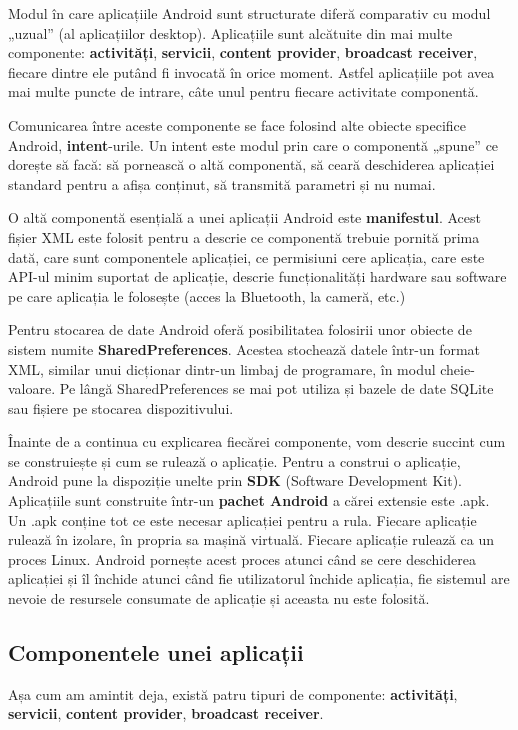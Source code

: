 \documentclass[12pt,a4paper]{article}
\begin{document}
Modul în care aplicațiile Android sunt structurate diferă comparativ cu modul „uzual” (al aplicațiilor desktop). Aplicațiile sunt alcătuite din mai multe componente: \textbf{activități}, \textbf{servicii}, \textbf{content provider}, \textbf{broadcast receiver}, fiecare dintre ele putând fi invocată în orice moment. Astfel aplicațiile pot avea mai multe puncte de intrare, câte unul pentru fiecare activitate componentă.

Comunicarea între aceste componente se face folosind alte obiecte specifice Android, \textbf{intent}-urile. Un intent este modul prin care o componentă „spune” ce dorește să facă: să pornească o altă componentă, să ceară deschiderea aplicației standard pentru a afișa conținut, să transmită parametri și nu numai.

O altă componentă esențială a unei aplicații Android este \textbf{manifestul}. Acest fișier XML este folosit pentru a descrie ce componentă trebuie pornită prima dată, care sunt componentele aplicației, ce permisiuni cere aplicația, care este API-ul minim suportat de aplicație, descrie funcționalități hardware sau software pe care aplicația le folosește (acces la Bluetooth, la cameră, etc.)

Pentru stocarea de date Android oferă posibilitatea folosirii unor obiecte de sistem numite \textbf{SharedPreferences}. Acestea stochează datele într-un format XML, similar unui dicționar dintr-un limbaj de programare, în modul cheie-valoare. Pe lângă SharedPreferences se mai pot utiliza și bazele de date SQLite sau fișiere pe stocarea dispozitivului.

Înainte de a continua cu explicarea fiecărei componente, vom descrie succint cum se construiește și cum se rulează o aplicație. Pentru a construi o aplicație, Android pune la dispoziție unelte prin \textbf{SDK} (Software Development Kit). Aplicațiile sunt construite într-un \textbf{pachet Android} a cărei extensie este .apk. Un .apk conține tot ce este necesar aplicației pentru a rula. Fiecare aplicație rulează în izolare, în propria sa mașină virtuală. Fiecare aplicație rulează ca un proces Linux. Android pornește acest proces atunci când se cere deschiderea aplicației și îl închide atunci când fie utilizatorul închide aplicația, fie sistemul are nevoie de resursele consumate de aplicație și aceasta nu este folosită.

\subsection{Componentele unei aplicații}
Așa cum am amintit deja, există patru tipuri de componente: \textbf{activități}, \textbf{servicii}, \textbf{content provider}, \textbf{broadcast receiver}.
\end{document}
